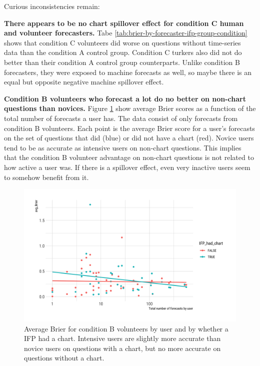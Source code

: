 \documentclass[]{article}
\begin{document}
Curious inconsistencies remain:

\textbf{There appears to be no chart spillover effect for condition C
human and volunteer forecasters.} Tabe
\ref{tab:brier-by-forecaster-ifp-group-condition} shows that condition C
volunteers did worse on questions without time-series data than the
condition A control group. Condition C turkers also did not do better
than their condition A control group counterparts. Unlike condition B
forecasters, they were exposed to machine forecasts as well, so maybe
there is an equal but opposite negative machine spillover effect.

\textbf{Condition B volunteers who forecast a lot do no better on
non-chart questions than novices.} Figure
\ref{fig:cond-b-volunteers-n-vs-brier} show average Brier scores as a
function of the total number of forecasts a user has. The data consist
of only forecasts from condition B volunteers. Each point is the average
Brier score for a user's forecasts on the set of questions that did
(blue) or did not have a chart (red). Novice users tend to be as
accurate as intensive users on non-chart questions. This implies that
the condition B volunteer advantage on non-chart questions is not
related to how active a user was. If there is a spillover effect, even
very inactive users seem to somehow benefit from it.

\begin{figure}
\caption{\label{fig:cond-b-volunteers-n-vs-brier} Average Brier for condition B volunteers by user and by whether a IFP had a chart. Intensive users are slightly more accurate than novice users on questions with a chart, but no more accurate on questions without a chart.}
\includegraphics{../output/figures/cond-b-volunteers-n-vs-brier.png}
\end{figure}
\end{document}
